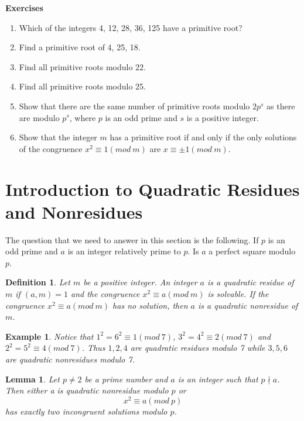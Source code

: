 \documentclass[12pt,letterpaper]{book}
\newtheorem{lemma}{Lemma}
\newtheorem{def1}{Definition}
\newtheorem{example}{Example}
\begin{document}
\textbf{Exercises}
\begin{enumerate}
\item{Which of the integers 4, 12, 28, 36, 125 have a
primitive root?}\item{Find a primitive root of 4, 25, 18.}\item{Find
all primitive roots modulo 22.}\item{Find
all primitive roots modulo 25.}\item{Show that there are the same
number of primitive roots modulo $2p ^s$ as there are modulo $p^s$,
where $p$ is an odd prime and $s$ is a positive integer.}\item{Show that the integer $m$ has a
primitive root if and only if the only solutions of the congruence
$x^2\equiv 1(mod \ m)$ are $x\equiv \pm1 (mod \ m)$.}
\end{enumerate}

\newpage

\section{Introduction to Quadratic Residues and Nonresidues}
The question that we need to answer in this section is the
following.  If $p$ is an odd prime and $a$ is an integer relatively
prime to $p$. Is $a$ a perfect square modulo $p$. 
\begin{def1}
Let $m$ be a positive integer.  An integer $a$ is a quadratic
residue of $m$ if $(a,m)=1$ and the congruence $x^2\equiv a (mod \
m)$ is solvable. If the congruence $x^2\equiv a (mod \ m)$ has no
solution, then $a$ is a quadratic nonresidue of $m$.
\end{def1}
\begin{example}
Notice that $1^2=6^2\equiv 1(mod \ 7)$, $3^2=4^2\equiv 2(mod \ 7)$
and $2^2=5^2\equiv 4(mod \ 7)$.  Thus $1,2,4$ are quadratic residues
modulo 7 while $3,5,6$ are quadratic nonresidues modulo 7.
\end{example}

\begin{lemma}
Let $p\neq 2$ be a prime number and $a$ is an integer such that
$p\nmid a$. Then either a is quadratic nonresidue modulo $p$ or
\begin{equation*}
x^2\equiv a(mod \ p)
\end{equation*}
has exactly two incongruent solutions modulo $p$.
\end{lemma}
\end{document}
